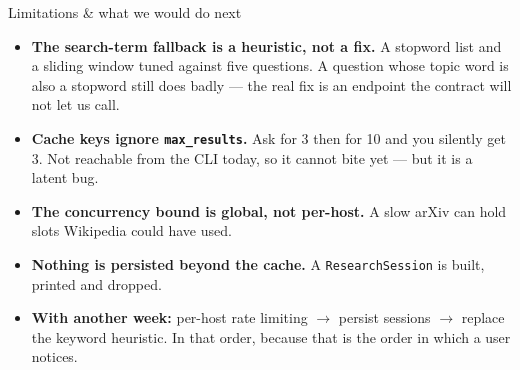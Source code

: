 \documentclass[aspectratio=169,11pt]{beamer}
\begin{document}
\begin{frame}{Limitations \& what we would do next}
  \begin{itemize}\setlength\itemsep{4pt}
    \item \textbf{The search-term fallback is a heuristic, not a fix.} A stopword list and a sliding
    window tuned against five questions. A question whose topic word is also a stopword still does
    badly --- the real fix is an endpoint the contract will not let us call.
    \item \textbf{Cache keys ignore \texttt{max\_results}.} Ask for 3 then for 10 and you silently
    get 3. Not reachable from the CLI today, so it cannot bite yet --- but it is a latent bug.
    \item \textbf{The concurrency bound is global, not per-host.} A slow arXiv can hold slots
    Wikipedia could have used.
    \item \textbf{Nothing is persisted beyond the cache.} A \texttt{ResearchSession} is built,
    printed and dropped.
    \item \textbf{With another week:} per-host rate limiting $\rightarrow$ persist sessions
    $\rightarrow$ replace the keyword heuristic. In that order, because that is the order in which a
    user notices.
  \end{itemize}
\end{frame}
\end{document}
